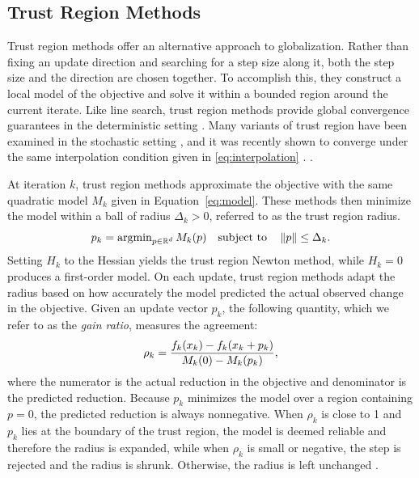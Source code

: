 \subsection{Trust Region Methods} \label{subsec:trust_region}
Trust region methods offer an alternative approach to globalization. Rather than fixing an update direction and searching for a step size along it, both the step size and the direction are chosen together. To accomplish this, they construct a local model of the objective and solve it within a bounded region around the current iterate. Like line search, trust region methods provide global convergence guarantees in the deterministic setting \cite{nocedal2006numerical}. Many variants of trust region have been examined in the stochastic setting , and it was recently shown to converge under the same interpolation condition given in \ref{eq:interpolation} . . 

At iteration $k$, trust region methods approximate the objective with the same quadratic model $M_k$ given in Equation~\eqref{eq:model}. These methods then minimize the model within a ball of radius $\Delta_k > 0$, referred to as the trust region radius.
\begin{equation}
    p_k = \operatorname{argmin}_{p \in \mathbb{R}^d} M_k(p) \quad \text{subject to} \quad \left \lVert p \right \rVert \le \Delta_k.
    \label{eq:tr_subproblem}
\end{equation}
Setting $H_k$ to the Hessian yields the trust region Newton method, while $H_k = 0$ \cite{nocedal2006numerical} produces a first-order model. On each update, trust region methods adapt the radius based on how accurately the model predicted the actual observed change in the objective. Given an update vector $p_k$, the following quantity, which we refer to as the \textit{gain ratio}, measures the agreement:
\begin{equation}
    \rho_k = \frac{f_k(x_{k}) - f_k(x_{k} + p_k)}{M_k(0) - M_k(p_k)},
    \label{eq:tr_ratio}
\end{equation}
where the numerator is the actual reduction in the objective and denominator is the predicted reduction. Because $p_k$ minimizes the model over a region containing $p = 0$, the predicted reduction is always nonnegative. When $\rho_k$ is close to 1 and $p_k$ lies at the boundary of the trust region, the model is deemed reliable and therefore the radius is expanded, while when $\rho_k$ is small or negative, the step is rejected and the radius is shrunk. Otherwise, the radius is left unchanged \cite{nocedal2006numerical}.


